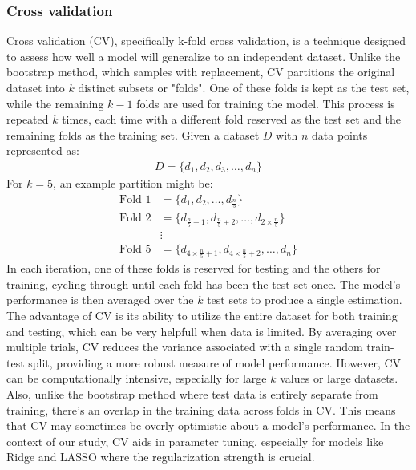 \subsubsection{Cross validation}
\noindent Cross validation (CV), specifically k-fold cross validation, is a technique designed to assess how well a model will generalize to an independent dataset. Unlike the bootstrap method, which samples with replacement, CV partitions the original dataset into \(k\) distinct subsets or "folds". One of these folds is kept as the test set, while the remaining \(k-1\) folds are used for training the model. This process is repeated \(k\) times, each time with a different fold reserved as the test set and the remaining folds as the training set. Given a dataset \(D\) with \(n\) data points represented as:
\begin{align}
    D = \{d_1, d_2, d_3, \dots, d_n\}
\end{align}
For \(k=5\), an example partition might be:
\begin{align}
    \text{Fold 1} &= \{d_1, d_2, \dots, d_{\frac{n}{5}}\} \\
    \text{Fold 2} &= \{d_{\frac{n}{5}+1}, d_{\frac{n}{5}+2}, \dots, d_{2 \times \frac{n}{5}}\} \\
    &\vdots \\
    \text{Fold 5} &= \{d_{4 \times \frac{n}{5}+1}, d_{4 \times \frac{n}{5}+2}, \dots, d_n\}
\end{align}
In each iteration, one of these folds is reserved for testing and the others for training, cycling through until each fold has been the test set once. The model's performance is then averaged over the \(k\) test sets to produce a single estimation.
The advantage of CV is its ability to utilize the entire dataset for both training and testing, which can be very helpfull when data is limited. By averaging over multiple trials, CV reduces the variance associated with a single random train-test split, providing a more robust measure of model performance.
However, CV can be computationally intensive, especially for large \(k\) values or large datasets. Also, unlike the bootstrap method where test data is entirely separate from training, there's an overlap in the training data across folds in CV. This means that CV may sometimes be overly optimistic about a model's performance.
In the context of our study, CV aids in parameter tuning, especially for models like Ridge and LASSO where the regularization strength is crucial.




